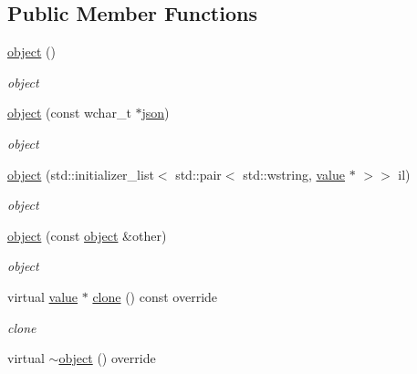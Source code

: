 \subsection*{Public Member Functions}
\begin{DoxyCompactItemize}
\item 
\hyperlink{classformat_1_1object_a70e9c7d76fc5cc4fcc0e0d4612846f11}{object} ()\hypertarget{classformat_1_1object_a70e9c7d76fc5cc4fcc0e0d4612846f11}{}\label{classformat_1_1object_a70e9c7d76fc5cc4fcc0e0d4612846f11}

\begin{DoxyCompactList}\small\item\em object \end{DoxyCompactList}\item 
\hyperlink{classformat_1_1object_a0c0e369bcf4d47f71dda07547bee4d23}{object} (const wchar\+\_\+t $\ast$\hyperlink{classformat_1_1json}{json})
\begin{DoxyCompactList}\small\item\em object \end{DoxyCompactList}\item 
\hyperlink{classformat_1_1object_a662c556b66222187d4f597db0b868404}{object} (std\+::initializer\+\_\+list$<$ std\+::pair$<$ std\+::wstring, \hyperlink{classformat_1_1value_aa6b85823936bf7b8ab78d3f8d443c00d}{value} $\ast$ $>$$>$ il)
\begin{DoxyCompactList}\small\item\em object \end{DoxyCompactList}\item 
\hyperlink{classformat_1_1object_a07b0e1989322aabec4f767cff13be567}{object} (const \hyperlink{classformat_1_1object}{object} \&other)
\begin{DoxyCompactList}\small\item\em object \end{DoxyCompactList}\item 
virtual \hyperlink{classformat_1_1value_aa6b85823936bf7b8ab78d3f8d443c00d}{value} $\ast$ \hyperlink{classformat_1_1object_a3e6550914c83ba0796877e5da8a511bd}{clone} () const override
\begin{DoxyCompactList}\small\item\em clone \end{DoxyCompactList}\item 
virtual \hyperlink{classformat_1_1object_a023704895a984b93cdfe947cf52a2774}{$\sim$object} () override\hypertarget{classformat_1_1object_a023704895a984b93cdfe947cf52a2774}{}\label{classformat_1_1object_a023704895a984b93cdfe947cf52a2774}


\end{DoxyCompactItemize}
